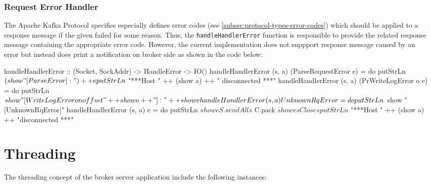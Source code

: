 \subsubsection{Request Error Handler}

The Apache Kafka Protocol specifies especially
defines error codes (see \ref{subsec:protocol-types-error-codes}) which should
be applied to a response message if the given failed for some reason. Thus, the
\lstinline{handleHandlerError} function is responsible to provide the related
response message containing the appropriate error code. However, the current
implementation does not suppport response message caused by an error but instead
does print a notification on broker side as shown in the code below:

\begin{code}
handleHandlerError :: (Socket, SockAddr) -> HandleError -> IO()
handleHandlerError (s, a) (ParseRequestError e) = do
    putStrLn $ (show "[ParseError]: ") ++ e
    putStrLn $ "***Host " ++ (show a) ++ " disconnected ***"
handleHandlerError (s, a) (PrWriteLogError o e) = do
    putStrLn $ show "[WriteLogError on offset " ++ show o ++ "]: " ++ show e
handleHandlerError (s, a) UnknownRqError = do
    putStrLn $ show "[UnknownRqError]"
handleHandlerError (s, a) e = do
    putStrLn $ show e
    S.sendAll s $ C.pack $ show e
    sClose s
    putStrLn $ "***Host " ++ (show a) ++ "disconnected ***"
\end{code}


\section{Threading}
\label{sec:impl-broker-threading}
The threading concept of the broker server application include the following
instances: 

